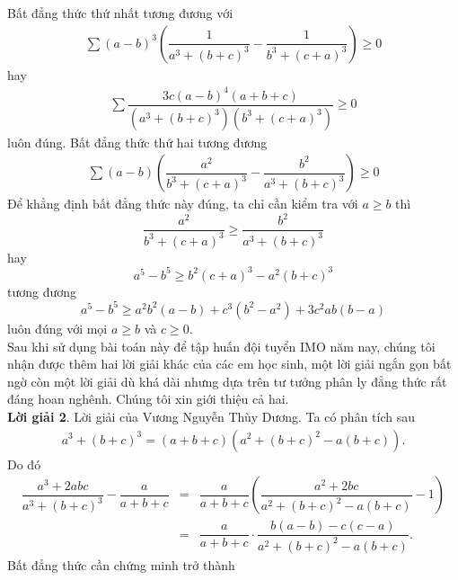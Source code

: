 \begin{bt}
{Bất đẳng thức thứ nhất tương đương với
\begin{eqnarray*}
	\sum\left(a-b\right)^3\left(\dfrac{1}{a^3+\left(b+c\right)^3}-\dfrac{1}{b^3+\left(c+a\right)^3}\right)\geq 0
\end{eqnarray*}
hay
\begin{eqnarray*}
	\sum\dfrac{3c\left(a-b\right)^4\left(a+b+c\right)}{\left(a^3+\left(b+c\right)^3\right)\left(b^3+\left(c+a\right)^3\right)}\geq 0
\end{eqnarray*}
luôn đúng. Bất đẳng thức thứ hai tương đương
\begin{eqnarray*}
	\sum\left(a-b\right)\left(\dfrac{a^2}{b^3+\left(c+a\right)^3}-\dfrac{b^2}{a^3+\left(b+c\right)^3}\right)\geq 0
\end{eqnarray*}
Để khẳng định bất đẳng thức này đúng, ta chỉ cần kiểm tra với $a\geq b$ thì
\begin{displaymath}
\dfrac{a^2}{b^3+(c+a)^3}\geq \dfrac{b^2}{a^3+(b+c)^3}
\end{displaymath}
hay
\begin{displaymath}
a^5-b^5\geq b^2\left(c+a\right)^3-a^2\left(b+c\right)^3
\end{displaymath}
tương đương
\begin{displaymath}
a^5-b^5\geq a^2b^2\left(a-b\right)+c^3\left(b^2-a^2\right)+3c^2ab\left(b-a\right)
\end{displaymath}
luôn đúng với mọi $a\geq b$ và $c\geq 0$.\\
\noindent Sau khi sử dụng bài toán này để tập huấn đội tuyển IMO năm nay, chúng tôi nhận được thêm hai lời giải khác của các em học sinh, một lời giải ngắn gọn bất ngờ còn một lời giải dù khá dài nhưng dựa trên tư tưởng phân ly đẳng thức rất đáng hoan nghênh. Chúng tôi xin giới thiệu cả hai.\\
{\bf{Lời giải 2}}. Lời giải của Vương Nguyễn Thùy Dương. Ta có phân tích sau\\
\begin{eqnarray*}
	a^3+\left(b+c\right)^3=\left(a+b+c\right)\left(a^2+(b+c)^2-a(b+c)\right).
\end{eqnarray*}
Do đó
\begin{eqnarray*}
\dfrac{a^3+2abc}{a^3+\left(b+c\right)^3}-\dfrac{a}{a+b+c}&=&\dfrac{a}{a+b+c}\left(\dfrac{a^2+2bc}{a^2+(b+c)^2-a(b+c)}-1\right)\\
&=&\dfrac{a}{a+b+c}\cdot\dfrac{b(a-b)-c(c-a)}{a^2+(b+c)^2-a(b+c)}.
\end{eqnarray*}
Bất đẳng thức cần chứng minh trở thành
\begin{displaymath}

\end{displaymath}}
\end{bt}
